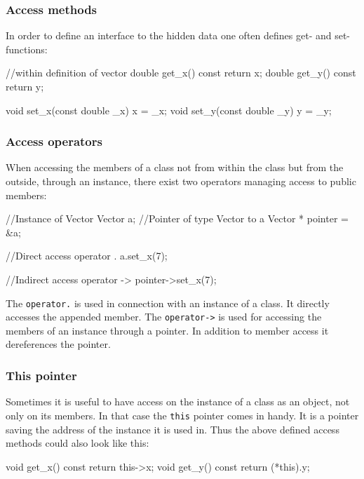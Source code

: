 \documentclass[10pt,a4paper]{scrartcl}
\begin{document}
\begin{multicols*}{2}
\subsubsection{Access methods}

In order to define an interface to the hidden data one often defines get- and set-functions:

\begin{TPCpp}
	//within definition of vector
	double get_x() const {return x;}
	double get_y() const {return y;}
	
	void set_x(const double _x) {x = _x;}
	void set_y(const double _y) {y = _y;}
\end{TPCpp}

\subsubsection{Access operators}

When accessing the members of a class not from within the class but from the outside, through an instance, there exist two operators managing access to public members:

\begin{TPCpp}
//Instance of Vector
Vector a;
//Pointer of type Vector to a
Vector * pointer = &a;

//Direct access operator .
a.set_x(7);

//Indirect access operator ->
pointer->set_x(7);
\end{TPCpp}

The \verb+operator.+ is used in connection with an instance of a class. It directly accesses the appended member. The \verb+operator->+ is used for accessing the members of an instance through a pointer. In addition to member access it dereferences the pointer.

\subsubsection{This pointer}

Sometimes it is useful to have access on the instance of a class as an object, not only on its members. In that case the \verb+this+ pointer comes in handy. It is a pointer saving the address of the instance it is used in. Thus the above defined access methods could also look like this:

\begin{TPCpp}
void get_x() const {return this->x;}
void get_y() const {return (*this).y;}
\end{TPCpp}


\end{multicols*}
\end{document}

